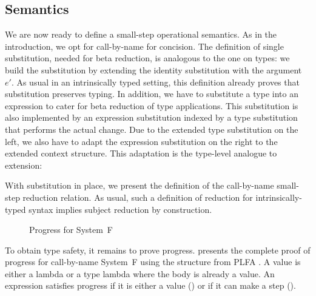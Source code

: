 \documentclass[manuscript,screen,review,anonymous,acmsmall]{acmart}
\begin{document}
\subsection{Semantics}
\label{sec:semantics}



We are now ready to define a small-step operational
semantics. As in the introduction, we opt for call-by-name for
concision. The definition of single substitution, needed for beta 
reduction, is analogous to the one on types: we build the substitution
by extending the identity substitution with the argument $e'$. As
usual in an intrinsically typed setting, this definition already proves
that substitution preserves typing.
\SFExprSemSingleSub
In addition, we have to substitute a type into an expression to
cater for beta reduction of type applications. This substitution is
also implemented by an expression substitution indexed by a type
substitution that performs the actual change.
\SFExprSemSingleTypeSub
Due to the extended type substitution on the left, we also have to
adapt the expression substitution on the right to the extended context
structure. This adaptation is the type-level analogue to extension:
\SFExprSubTExtension

With substitution in place, we present the definition of the call-by-name small-step
reduction relation. As usual, such a definition of reduction for
intrinsically-typed syntax implies subject reduction by construction.
\SFExprSemDefinition

\begin{figure}[tp]
  \begin{minipage}[t]{0.47\linewidth}
    \SFExprSemProgressDefs
    \SFExprSemNewNoVarDefs
  \end{minipage}
  \begin{minipage}[t]{0.49\linewidth}
    \SFExprSemNewProgress
  \end{minipage}
  \caption{Progress for System~F}
  \label{fig:system-f-progress}
\end{figure}

To obtain type safety, it remains to prove progress.
 presents the complete proof of progress
for call-by-name System~F using the structure from PLFA
\cite{DBLP:journals/scp/KokkeSW20}. A value is either a lambda or a
type lambda 
where the body is already a value. An expression satisfies progress if
it is either a value () or if it can make
a step ().
\end{document}
